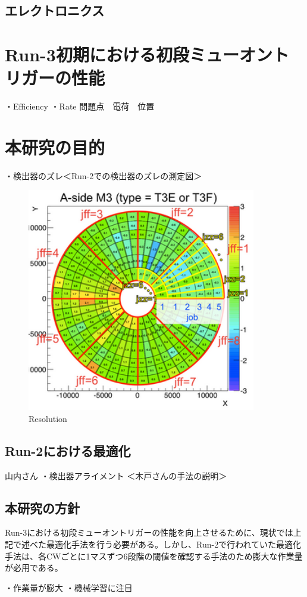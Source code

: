 \subsection{エレクトロニクス}

\section{Run-3初期における初段ミューオントリガーの性能}
・Efficiency
・Rate
問題点　電荷　位置

\section{本研究の目的}
・検出器のズレ＜Run-2での検出器のズレの測定図＞
\begin{figure}[tb]
  \centering
  \includegraphics[clip, width=10cm]{fig/4/zure.png}
  \caption{Resolution}
  \label{fig:Resolution}
\end{figure}

\subsection{Run-2における最適化}
山内さん
・検出器アライメント
＜木戸さんの手法の説明＞
\subsection{本研究の方針}
Run-3における初段ミューオントリガーの性能を向上させるために、現状では上記で述べた最適化手法を行う必要がある。しかし、Run-2で行われていた最適化手法は、各CWごとに1マスずつ6段階の閾値を確認する手法のため膨大な作業量が必用である。

・作業量が膨大
・機械学習に注目















